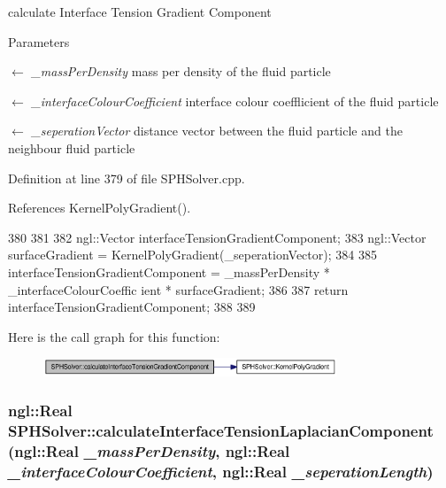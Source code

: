 calculate Interface Tension Gradient Component 


\begin{DoxyParams}{Parameters}
\item[\mbox{$\leftarrow$} {\em \_\-massPerDensity}]mass per density of the fluid particle \item[\mbox{$\leftarrow$} {\em \_\-interfaceColourCoefficient}]interface colour coefflicient of the fluid particle \item[\mbox{$\leftarrow$} {\em \_\-seperationVector}]distance vector between the fluid particle and the neighbour fluid particle \end{DoxyParams}


Definition at line 379 of file SPHSolver.cpp.



References KernelPolyGradient().




\begin{DoxyCode}
380 {
381 
382     ngl::Vector interfaceTensionGradientComponent;
383     ngl::Vector surfaceGradient =  KernelPolyGradient(_seperationVector);
384 
385     interfaceTensionGradientComponent = _massPerDensity * _interfaceColourCoeffic
      ient * surfaceGradient;
386 
387     return interfaceTensionGradientComponent;
388 
389 }
\end{DoxyCode}




Here is the call graph for this function:\nopagebreak
\begin{figure}[H]
\begin{center}
\leavevmode
\includegraphics[width=249pt]{class_s_p_h_solver_af6b1adebbc96d3cb22f6990a05694f70_cgraph}
\end{center}
\end{figure}


\hypertarget{class_s_p_h_solver_ac1f193569656db4fe11aa5f716c5169b}{
\subsubsection[{calculateInterfaceTensionLaplacianComponent}]{\setlength{\rightskip}{0pt plus 5cm}ngl::Real SPHSolver::calculateInterfaceTensionLaplacianComponent (ngl::Real {\em \_\-massPerDensity}, \/  ngl::Real {\em \_\-interfaceColourCoefficient}, \/  ngl::Real {\em \_\-seperationLength})}}
\label{class_s_p_h_solver_ac1f193569656db4fe11aa5f716c5169b}


